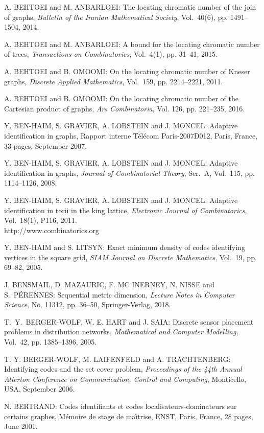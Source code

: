 \begin{thebibliography}{999}
A. BEHTOEI and M. ANBARLOEI: The locating chromatic number of the join of graphs, {\it Bulletin of the Iranian Mathematical Society}, Vol.~40(6), pp. 1491--1504, 2014.

A. BEHTOEI and M. ANBARLOEI: A bound for the locating chromatic number of trees, {\it Transactions on Combinatorics}, Vol.~4(1), pp. 31--41, 2015.

A. BEHTOEI and B. OMOOMI: On the locating chromatic number of Kneser graphs, {\it Discrete Applied Mathematics}, Vol.~159, pp. 2214--2221, 2011.

A. BEHTOEI and B. OMOOMI: On the locating chromatic number of the Cartesian product of graphs, {\it Ars Combinatoria}, Vol. 126, pp. 221--235, 2016.
  
Y. BEN-HAIM, S. GRAVIER, A. LOBSTEIN and J. MONCEL: Adaptive identification in graphs, Rapport interne T\'el\'ecom Paris-2007D012, Paris, France, 33 pages, September 2007.

Y. BEN-HAIM, S. GRAVIER, A. LOBSTEIN and J. MONCEL: Adaptive identification in graphs, {\it Journal of Combinatorial Theory}, Ser.~A, Vol.~115, pp. 1114--1126, 2008.

Y. BEN-HAIM, S. GRAVIER, A. LOBSTEIN and J. MONCEL: Adaptive identification in torii in the king lattice, {\it Electronic Journal of Combinatorics}, Vol.~18(1), P116, 2011.\\
http://www.combinatorics.org

Y. BEN-HAIM and S. LITSYN: Exact minimum density of codes identifying vertices in the square grid, {\it SIAM Journal on Discrete Mathematics}, Vol.~19, pp. 69--82, 2005.

J. BENSMAIL, D. MAZAURIC, F. MC INERNEY, N. NISSE and S.~P\'E\-RENNES: Sequential metric dimension, {\it Lecture Notes in Computer Science}, No. 11312, pp. 36--50, Springer-Verlag, 2018.

T.~Y.~BERGER-WOLF, W. E. HART and J. SAIA: Discrete sensor placement problems in distribution networks, {\it Mathematical and Computer Modelling}, Vol.~42, pp. 1385--1396, 2005.

T. Y. BERGER-WOLF, M. LAIFENFELD and A. TRACHTENBERG: Identifying codes and the set cover problem, {\it Proceedings of the 44th Annual Allerton Conference on Communication, Control and Computing}, Monticello, USA, September 2006.

N. BERTRAND: Codes identifiants et codes localisateurs-dominateurs sur certains graphes, M\'emoire de stage de ma\^{\i}trise, ENST, Paris, France, 28 pages, June 2001.


\end{thebibliography}
